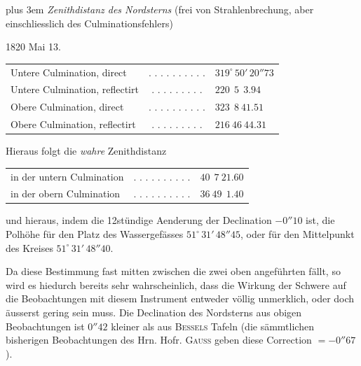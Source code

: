 {\rightskip=0pt plus 3em \textit{Zenithdistanz des Nordsterns} (frei von Strahlenbrechung, aber einschliesslich des
Culminationsfehlers)\par}

\begin{center}
1820 Mai 13.
\end{center}

\begin{center}
\begin{tabular}{l c l}
Untere Culmination, direct & . . . . . . . . . . & $319^\circ\,50'\,20''\!73$ \\
Untere Culmination, reflectirt & . . . . . . . . . & $220\ \ 5\ \ 3.94$ \\
Obere Culmination, direct & . . . . . . . . . . & $323\ \ 8\ 41.51$ \\
Obere Culmination, reflectirt & . . . . . . . . . & $216\ 46\ 44.31$ \\
\end{tabular}
\end{center}

\begin{center}
Hieraus folgt die \textit{wahre} Zenithdistanz
\end{center}

\begin{center}
\begin{tabular}{l c l}
in der untern Culmination & . . . . . . . . . . & $40\ \ 7\ 21.60$ \\
in der obern Culmination & . . . . . . . . . . & $36\ 49\ \ 1.40$ \\
\end{tabular}
\end{center}

\noindent und hieraus, indem die 12stündige Aenderung der Declination $-0''10$ ist, die Polhöhe für den
Platz des Wassergefässes $51^\circ\,31'\,48''\!45$, oder für den Mittelpunkt des Kreises
$51^\circ\,31'\,48''\!40$.

\par\indent Da diese Bestimmung fast mitten zwischen die zwei oben angeführten fällt, so wird es hiedurch
bereits sehr wahrscheinlich, dass die Wirkung der Schwere auf die Beobachtungen mit diesem
Instrument entweder völlig unmerklich, oder doch äusserst gering sein muss. Die Declination des
Nordsterns aus obigen Beobachtungen ist $0''42$ kleiner als aus \textsc{Bessels} Tafeln (die
sämmtlichen bisherigen Beobachtungen des Hrn. Hofr. \textsc{Gauss} geben diese Correction $=
-0''67$).

